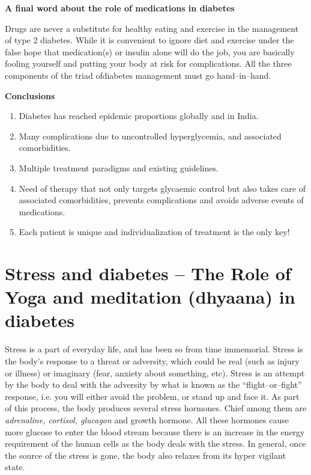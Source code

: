 \noindent\textbf{A final word about the role of medications in diabetes}

Drugs are never a substitute for healthy eating and exercise in the management of type 2 diabetes. While it is convenient to ignore diet and exercise under the false hope that medication(s) or insulin alone will do the job, you are basically fooling yourself and putting your body at risk for complications. All the three components of the triad of\break diabetes management must go hand–in–hand.

\vskip 6pt

\noindent\textbf{Conclusions}

\begin{enumerate}[•]
\itemsep=0pt
\item Diabetes has reached epidemic proportions globally and in India.
\item Many complications due to uncontrolled hyperglycemia, and asso\-ciated comorbidities.
\item Multiple treatment paradigms and existing guidelines.
\item Need of therapy that not only targets glycaemic control but also takes care of associated comorbidities, prevents complications and avoids adverse events of medications.
\item Each patient is unique and individualization of treatment is the only key!
\end{enumerate}


\chapter{Stress and diabetes – The Role of Yoga and meditation (dhyaana) in diabetes}\label{chap27}

Stress is a part of everyday life, and has been so from time immemorial. Stress is the body’s response to a threat or adversity, which could be real (such as injury or illness) or imaginary (fear, anxiety about something, etc). Stress is an attempt by the body to deal with the adversity by what is known as the “flight–or–fight” response, i.e. you will either avoid the problem, or stand up and face it. As part of this process, the body produces several stress hormones. Chief among them are \textit{adrenaline, cortisol, glucagon} and growth hormone. All these hormones cause more glucose to enter the blood stream because there is an increase in the energy requirement of the human cells as the body deals with the stress. In general, once the source of the stress is gone, the body also relaxes from its hyper vigilant state.

